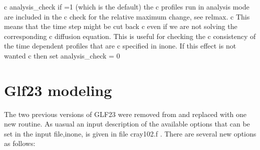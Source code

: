 \documentclass[12pt]{article}
\begin{document}
c  analysis\_check if =1   (which is the default) the
c                 profiles run in analysis mode are included in the
c                 check for the relative maximum change, see relmax.
c                 This means that the time step might be cut back
c                 even if we are not solving the corresponding
c                 diffusion equation. This is useful for checking the
c                 consistency of the time dependent profiles that are 
c                 specified in inone. If this effect is not wanted
c                  then set analysis\_check = 0

\section{Glf23 modeling}
      The two previous versions of GLF23  were removed from \ot and
      replaced with one  new routine. As uasual an input description
      of the available options that can be set in the \ot input
      file,inone, 
      is given in file cray102.f . There are several new options
      as follows:
\end{document}
